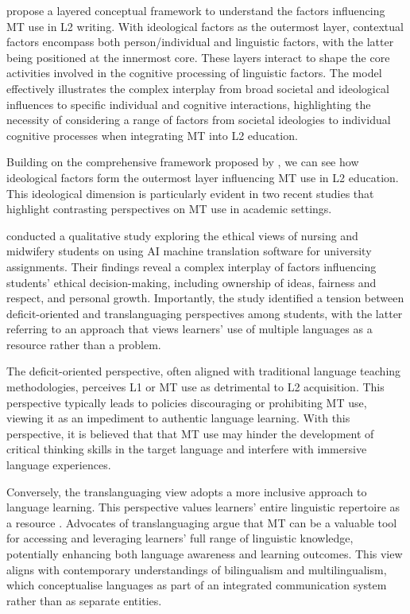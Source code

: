 \documentclass[output=paper]{langscibook}
\begin{document}
\citet{jiangetal24} propose a layered conceptual framework to understand the factors influencing MT use in L2 writing. With ideological factors as the outermost layer, contextual factors encompass both person/individual and linguistic factors, with the latter being positioned at the innermost core. These layers interact to shape the core activities involved in the cognitive processing of linguistic factors. The model effectively illustrates the complex interplay from broad societal and ideological influences to specific individual and cognitive interactions, highlighting the necessity of considering a range of factors from societal ideologies to individual cognitive processes when integrating MT into L2 education.

Building on the comprehensive framework proposed by \citet{jiangetal24}, we can see how ideological factors form the outermost layer influencing MT use in L2 education. This ideological dimension is particularly evident in two recent studies that highlight contrasting perspectives on MT use in academic settings.

\citet{grieveetal24} conducted a qualitative study exploring the ethical views of nursing and midwifery students on using AI machine translation software for university assignments. Their findings reveal a complex interplay of factors influencing students’ ethical decision-making, including ownership of ideas, fairness and respect, and personal growth. Importantly, the study identified a tension between deficit-oriented and translanguaging perspectives among students, with the latter referring to an approach that views learners’ use of multiple languages as a resource rather than a problem.

The deficit-oriented perspective, often aligned with traditional language teaching methodologies, perceives L1 or MT use as detrimental to L2 acquisition. This perspective typically leads to policies discouraging or prohibiting MT use, viewing it as an impediment to authentic language learning. With this perspective, it is believed that that MT use may hinder the development of critical thinking skills in the target language and interfere with immersive language experiences.

Conversely, the translanguaging view adopts a more inclusive approach to language learning. This perspective values learners’ entire linguistic repertoire as a resource \citep{wei2018}. Advocates of translanguaging argue that MT can be a valuable tool for accessing and leveraging learners’ full range of linguistic knowledge, potentially enhancing both language awareness and learning outcomes. This view aligns with contemporary understandings of bilingualism and multilingualism, which conceptualise languages as part of an integrated communication system rather than as separate entities.
\end{document}
